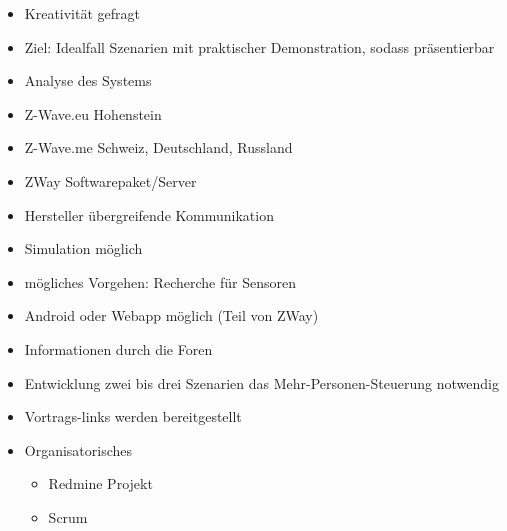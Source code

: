 \begin{itemize}
	\item Kreativität gefragt
	\item Ziel: Idealfall Szenarien mit praktischer Demonstration, sodass präsentierbar
	\item Analyse des Systems
	\item Z-Wave.eu \textrightarrow{ }Hohenstein
	\item Z-Wave.me \textrightarrow{ }Schweiz, Deutschland, Russland
	\item ZWay \textrightarrow{ }Softwarepaket/Server
	\item Hersteller übergreifende Kommunikation
	\item Simulation möglich
	\item mögliches Vorgehen: Recherche für Sensoren
	\item Android oder Webapp möglich (Teil von ZWay)
	\item Informationen durch die Foren
	\item Entwicklung zwei bis drei Szenarien das Mehr-Personen-Steuerung notwendig
	\item Vortrags-links werden bereitgestellt
	\item Organisatorisches
	\begin{itemize}
		\item Redmine Projekt
		\item Scrum
	\end{itemize}
\end{itemize}

